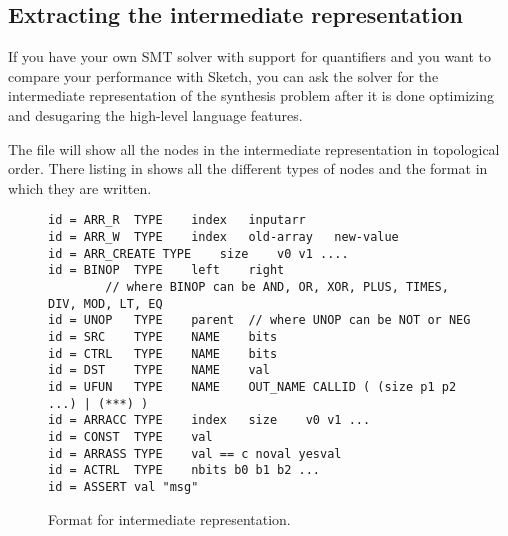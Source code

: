 


\subsection{Extracting the intermediate representation}
If you have your own SMT solver with support for quantifiers and you want to compare your performance with Sketch, you can ask the solver for the intermediate representation of the synthesis problem after it is done optimizing and desugaring the high-level language features. 


The file will show all the nodes in the intermediate representation in topological order. There listing in  shows all the different types of nodes and the format in which they are written. 
\begin{figure}
\begin{lstlisting}
id = ARR_R	TYPE	index	inputarr
id = ARR_W	TYPE	index	old-array	new-value
id = ARR_CREATE TYPE	size	v0 v1 ....
id = BINOP	TYPE	left	right	
        // where BINOP can be AND, OR, XOR, PLUS, TIMES, DIV, MOD, LT, EQ
id = UNOP	TYPE	parent	// where UNOP can be NOT or NEG
id = SRC	TYPE	NAME	bits
id = CTRL	TYPE	NAME	bits
id = DST	TYPE	NAME	val
id = UFUN	TYPE	NAME	OUT_NAME CALLID ( (size p1 p2 ...) | (***) )
id = ARRACC	TYPE	index 	size	v0 v1 ...
id = CONST	TYPE	val
id = ARRASS	TYPE	val == c noval yesval
id = ACTRL	TYPE	nbits b0 b1 b2 ...
id = ASSERT	val	"msg"
\end{lstlisting}
\caption{Format for intermediate representation.}
\end{figure}

